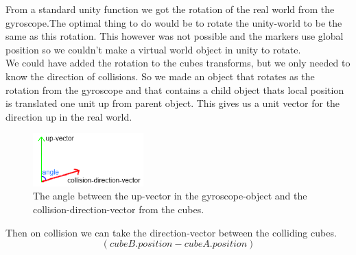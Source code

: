 From a standard unity function we got the rotation of the real world from the gyroscope.The optimal thing to do would be to rotate the unity-world to be the same as this rotation. This however was not possible and the markers use global position so we couldn't make a virtual world object in unity to rotate.\\
We could have added the rotation to the cubes transforms, but we only needed to know the direction of collisions. So we made an object that rotates as the rotation from the gyroscope and that contains a child object thats local position is translated one unit up from parent object. This gives us a unit vector for the direction up in the real world.


\begin{figure}
        \capstart
        \centering
        \vspace{-10pt}
        \includegraphics[width=0.38\textwidth]{images/CollisionDirectionAngleModel.png}
        \vspace{-10pt}
        \caption[Model for finding the angle between the vectors]{The angle between the up-vector in the gyroscope-object and the collision-direction-vector from the cubes.}
        \vspace{-10pt}
        \label{fig:Vector_Angle_model}
\end{figure}

Then on collision we can take the direction-vector between the colliding cubes. 
\[
(cubeB.position - cubeA.position)
\]


